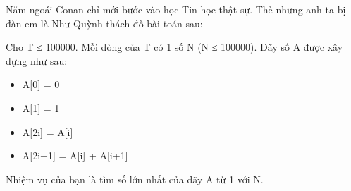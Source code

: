 Năm ngoái Conan chỉ mới bước vào học Tin học thật sự. Thế nhưng anh ta bị đàn em là Như Quỳnh thách đố bài toán sau:  

   Cho T ≤ 100000. Mỗi dòng của T có 1 số N (N ≤ 100000). Dãy số A được xây dựng như sau:  
\begin{itemize}
	\item     A[0]    = 0   
	\item     A[1]    = 1   
	\item     A[2i]   = A[i]   
	\item     A[2i+1] = A[i] + A[i+1]   
\end{itemize}

   Nhiệm vụ của bạn là tìm số lớn nhất của dãy A từ 1 với N.